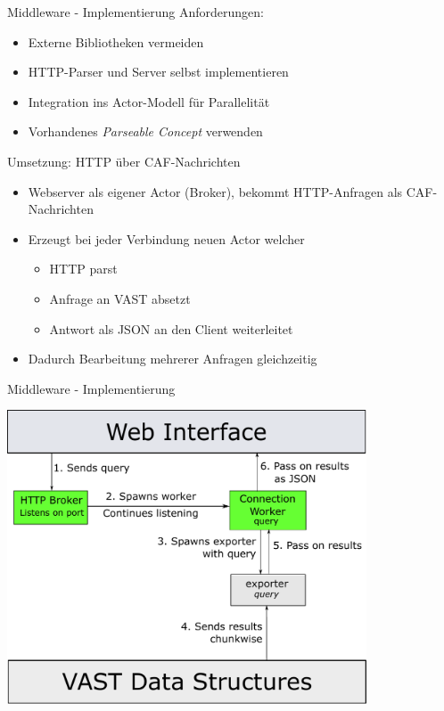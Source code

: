 \documentclass[9pt]{beamer}
\begin{document}
\begin{frame}{Middleware - Implementierung}{}
	Anforderungen:
	\begin{itemize}
		\item Externe Bibliotheken vermeiden
		\item HTTP-Parser und Server selbst implementieren
		\item Integration ins Actor-Modell für Parallelität
		\item Vorhandenes \emph{Parseable Concept} verwenden
	\end{itemize}
	Umsetzung: HTTP über CAF-Nachrichten
	\begin{itemize}
        \item Webserver als eigener Actor (Broker), bekommt HTTP-Anfragen als CAF-Nachrichten
		\item Erzeugt bei jeder Verbindung neuen Actor welcher
            \begin{itemize}
                \item HTTP parst
                \item Anfrage an VAST absetzt
                \item Antwort als JSON an den Client weiterleitet
            \end{itemize}
		\item Dadurch Bearbeitung mehrerer Anfragen gleichzeitig
	\end{itemize}
\end{frame}
\begin{frame}{Middleware - Implementierung}{}
	\begin{center}
	\includegraphics[width=0.8\textwidth]{res/swp_vast_detail.pdf}
	\end{center}
\end{frame}
\end{document}

